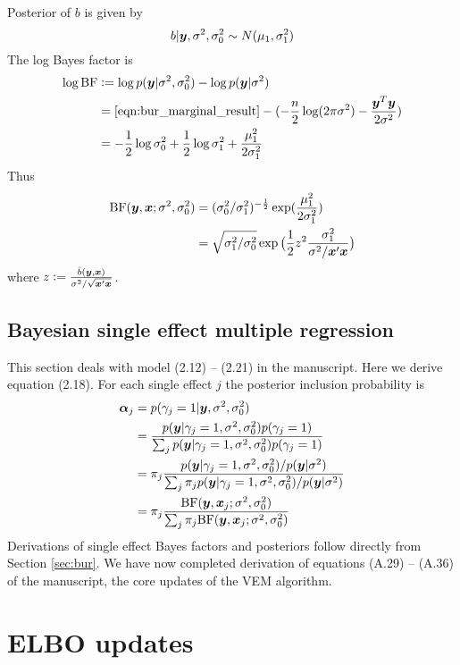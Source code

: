 Posterior of $b$ is given by
\begin{equation}
b | \bm y, \sigma^2, \sigma^2_0 \sim N(\mu_1, \sigma^2_1)
\end{equation}
The log Bayes factor is
\begin{align}
    \log \text{BF} & := \log p(\bm y|\sigma^2, \sigma^2_0) - \log p(\bm y | \sigma^2) \\
    &= \eqref{eqn:bur_marginal_result} - (-\frac{n}{2}\log(2\pi\sigma^2) - \frac{\bm y^T\bm y}{2\sigma^2}) \\
    &= - \frac{1}{2} \log \sigma^2_0 + \frac{1}{2}\log \sigma^2_1 + \frac{\mu_1^2}{2\sigma^2_1}
\end{align}
Thus 
\begin{align}
\text{BF}(\bm y, \bm x; \sigma^2, \sigma^2_0) &= (\sigma^2_0/\sigma^2_1)^{-\frac{1}{2}}\exp(\frac{\mu_1^2}{2\sigma^2_1}) \\
& = \sqrt{\sigma^2_1/\sigma^2_0}\exp{\big(\frac{1}{2}z^2\frac{\sigma^2_1}{\sigma^2/\bm x'\bm x}\big)} 
\end{align}
where $z:=\frac{\hat{b}(\bm y, \bm x)}{\sigma^2/\sqrt{\bm x'\bm x}}$.

\subsection{Bayesian single effect multiple regression} \label{sec:bser}

This section deals with model (2.12) -- (2.21) in the manuscript. Here we derive equation (2.18). For each single effect $j$ the posterior inclusion probability is
\begin{align}
    \bm \alpha_j &= p(\gamma_j = 1 | \bm y, \sigma^2, \sigma^2_0) \\
    &= \frac{p(\bm y | \gamma_j = 1, \sigma^2, \sigma^2_0)p(\gamma_j=1)}{\sum_j p(\bm y | \gamma_j = 1, \sigma^2, \sigma^2_0)p(\gamma_j=1)} \\
    &= \pi_j \frac{p(\bm y | \gamma_j = 1, \sigma^2, \sigma^2_0) / p(\bm y|\sigma^2)}{\sum_j \pi_j p(\bm y | \gamma_j = 1, \sigma^2, \sigma^2_0) / p(\bm y | \sigma^2)} \\
    &= \pi_j \frac{\text{BF}(\bm y, \bm x_j; \sigma^2, \sigma^2_0)}{\sum_j \pi_j \text{BF}(\bm y, \bm x_j; \sigma^2, \sigma^2_0)} \label{eqn:ser alpha}
\end{align}
Derivations of single effect Bayes factors and posteriors follow directly from Section \ref{sec:bur}. We have now completed derivation of equations (A.29) -- (A.36) of the manuscript, the core updates of the \susie VEM algorithm.

\section{ELBO updates}

